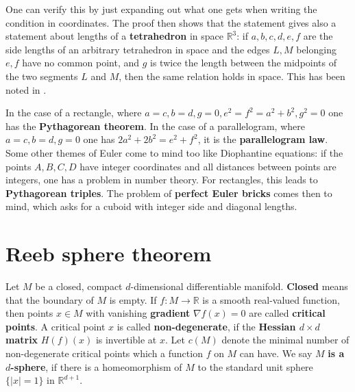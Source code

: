 \documentclass[12pt]{amsart}
\begin{document}
One can verify this by just expanding out what one gets when 
writing the condition in coordinates. The proof then shows that the
statement gives also a statement about lengths of a {\bf tetrahedron}
in space $\mathbb{R}^3$: if $a,b,c,d,e,f$ are the side lengths of an arbitrary tetrahedron
in space and the edges $L,M$ belonging $e,f$ have no common point, and $g$ is twice
the length between the midpoints of the two segments $L$ and $M$, then the same 
relation holds in space. This has been noted in \cite{Kandall2002}.
\begin{comment}
AA={a1,a2,a3}; BB={b1,b2,b3}; CC={c1,c2,c3}; DD={d1,d2,d3}; MM=(AA+CC)/2; NN=(BB+DD)/2;
aa=(AA-BB).(AA-BB); bb=(BB-CC).(BB-CC); cc=(CC-DD).(CC-DD); dd=(DD-AA).(DD-AA);
ee=(AA-CC).(AA-CC); ff=(BB-DD).(BB-DD); gg=4 (MM-NN).(MM-NN);
Simplify[aa+bb+cc+dd-ee-ff-gg] 
\end{comment}
In the case of a rectangle, where $a=c,b=d,g=0,e^2=f^2=a^2+b^2, g^2=0$
one has the {\bf Pythagorean theorem}. In the case of a parallelogram, where
$a=c,b=d,g=0$ one has $2a^2+2b^2=e^2+f^2$, it is the
{\bf parallelogram law}. 
Some other themes of Euler come to mind too like Diophantine equations:
if the points $A,B,C,D$ have integer coordinates and all
distances between points are integers, one has a problem in number theory. 
For rectangles, this leads to {\bf Pythagorean triples}.
The problem of {\bf perfect Euler bricks} comes then to mind, which asks for a
cuboid with integer side and diagonal lengths.

\section{Reeb sphere theorem}

Let $M$ be a closed, compact $d$-dimensional differentiable manifold. 
{\bf Closed} means that the boundary of $M$ is empty. If $f: M \to \mathbb{R}$
is a smooth real-valued function, then points $x \in M$ with vanishing {\bf gradient}
$\nabla f(x)=0$ are called 
{\bf critical points}. A critical point $x$ is called {\bf non-degenerate}, 
if the {\bf Hessian $d \times d$ matrix} $H(f)(x)$ is invertible at $x$.
Let $c(M)$ denote the minimal number of non-degenerate 
critical points which a function $f$ on $M$ can have. We say $M$ {\bf is a $d$-sphere}, if
there is a homeomorphism of $M$ to the standard unit sphere $\{ |x|=1 \}$ 
in $\mathbb{R}^{d+1}$.
\end{document}
